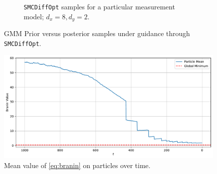 \begin{figure}[htbp]
\begin{subfigure}[b]{0.48\textwidth}
      \caption{\texttt{SMCDiffOpt} samples for a particular measurement model; $d_x = 8, d_y = 2$.}
      \label{fig:gmm-smc-samples}
    \end{subfigure}
    \caption{GMM Prior versus posterior samples under guidance through \texttt{SMCDiffOpt}.}
    \label{fig:gmm-prior-smc-samples}
\end{figure}

\begin{figure}[htbp]
    \centering
    \includegraphics[width=1\textwidth]{assets/smc_branin_mean_val.pdf}
    \caption{Mean value of \autoref{eq:branin} on particles over time.}
    \label{fig:branin-mean-val}
\end{figure}

